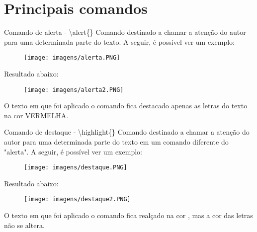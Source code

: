 \documentclass[aspectratio=169,smaller]{beamer}
\begin{document}
\section{Principais comandos}
\begin{frame}{Comando de alerta - \textbackslash alert\{\}}
\justifying
Comando destinado a chamar a atenção do autor para uma determinada parte do texto. A seguir, é possível ver um exemplo:

\begin{figure}
        \centering
        \texttt{[image: imagens/alerta.PNG]}
    \end{figure}

Resultado abaixo:

\begin{figure}
        \centering
        \texttt{[image: imagens/alerta2.PNG]}
    \end{figure}

O texto em que foi aplicado o comando fica destacado apenas as letras do texto na cor \alert{VERMELHA}.

\end{frame}  
\begin{frame}{Comando de destaque - \textbackslash highlight\{\}}
\justifying
Comando destinado a chamar a atenção do autor para uma determinada parte do texto em um comando diferente do "alerta". A seguir, é possível ver um exemplo:

\begin{figure}
        \centering
        \texttt{[image: imagens/destaque.PNG]}
    \end{figure}

Resultado abaixo:

\begin{figure}
        \centering
        \texttt{[image: imagens/destaque2.PNG]}
    \end{figure}

O texto em que foi aplicado o comando fica realçado na cor , mas a cor das letras não se altera.
\end{frame}
\end{document}
